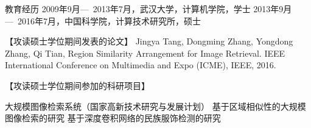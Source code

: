 
\begin{resume}

\begin{resumelist*}{教育经历}
\resumelistitem 2009年9月---~2013年7月，武汉大学，计算机学院，学士
\resumelistitem 2013年9月---~2016年7月，中国科学院，计算技术研究所，硕士
\end{resumelist*}

\begin{resumelist}{【攻读硕士学位期间发表的论文】}
\resumelistitem Jingya Tang, Dongming Zhang, Yongdong Zhang, Qi Tian, Region Similarity Arrangement for Image Retrieval. IEEE International Conference on Multimedia and Expo (ICME), IEEE, 2016. 
\end{resumelist}

\begin{resumelist}{【攻读硕士学位期间参加的科研项目】}

\resumelistitem 大规模图像检索系统（国家高新技术研究与发展计划）
\resumelistitem 基于区域相似性的大规模图像检索的研究 
\resumelistitem 基于深度卷积网络的民族服饰检测的研究

\end{resumelist}

\end{resume}
